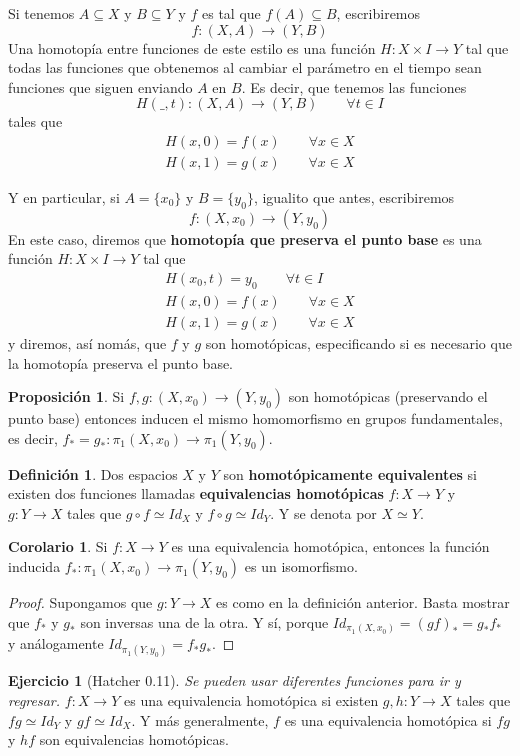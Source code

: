 \documentclass[spanish]{book}
\theoremstyle{definition}
\newtheorem*{defn}{Definición}
\newtheorem*{prop}{Proposición}
\newtheorem*{coro}{Corolario}
\newtheorem*{ejer}{Ejercicio}
\begin{document}
	Si tenemos $A\subseteq X$ y $B\subseteq Y$ y $f$ es tal que $f(A)\subseteq B$, escribiremos \[f:(X,A)\to(Y,B)\]Una homotopía entre funciones de este estilo es una función $H:X\times I\to Y$ tal que todas las funciones que obtenemos al cambiar el parámetro en el tiempo sean funciones que siguen enviando $A$ en $B$. Es decir, que tenemos las funciones \[H(\_,t):(X,A)\to(Y,B)\qquad\forall t\in I\] tales que 
	\begin{align*}
		H(x,0)=f(x)\qquad\forall x\in X\\
		H(x,1)=g(x)\qquad\forall x\in X
	\end{align*}
	
	Y en particular, si $A=\{x_0\}$ y $B=\{y_0\}$, igualito que antes, escribiremos \[f:(X,x_0)\to(Y,y_0)\]	
	En este caso, diremos que \textbf{homotopía que preserva el punto base} es una función $H:X\times I\to Y$ tal que 
		\begin{align*}
		H(x_0,t)=y_0\qquad\forall t\in I\\
		H(x,0)=f(x)\qquad\forall x\in X\\
		H(x,1)=g(x)\qquad\forall x\in X
	\end{align*}
	y diremos, así nomás, que $f$ y $g$ son homotópicas, especificando si es necesario que la homotopía preserva el punto base.
	\begin{prop}
		Si $f,g:(X,x_0)\to(Y,y_0)$ son homotópicas (preservando el punto base) entonces inducen el mismo homomorfismo en grupos fundamentales, es decir,  $f_*=g_*:\pi_1(X,x_0)\to\pi_1(Y,y_0)$.
	\end{prop}
	\begin{defn}
		Dos espacios $X$ y $Y$ son \textbf{homotópicamente equivalentes} si existen dos funciones llamadas \textbf{equivalencias homotópicas} $f:X\to Y$ y $g:Y\to X$ tales que $g\circ f\simeq Id_X$ y $f\circ g\simeq Id_Y$. Y se denota por $X\simeq Y$.
	\end{defn}
	\begin{coro}\label{1.2.1}
		Si $f:X\to Y$ es una equivalencia homotópica, entonces la función inducida $f_*:\pi_1(X,x_0)\to\pi_1(Y,y_0)$ es un isomorfismo.
	\end{coro}
	\begin{proof}
		Supongamos que $g:Y\to X$ es como en la definición anterior. Basta mostrar que $f_*$ y $g_*$ son inversas una de la otra. Y sí, porque $Id_{\pi_1(X,x_0)}=(g f)_*=g_*f_*$ y análogamente $Id_{\pi_1(Y,y_0)}=f_*g_*$.
	\end{proof}
	\begin{ejer}[Hatcher 0.11]\label{hatcher:0.11}
		\textit{Se pueden usar diferentes funciones para ir y regresar.} $f:X\to Y$ es una equivalencia homotópica si existen $g,h:Y\to X$ tales que $fg\simeq Id_Y$ y $gf\simeq Id_X$. Y más generalmente, $f$ es una equivalencia homotópica si $fg$ y $hf$ son equivalencias homotópicas.
	\end{ejer}
\end{document}
